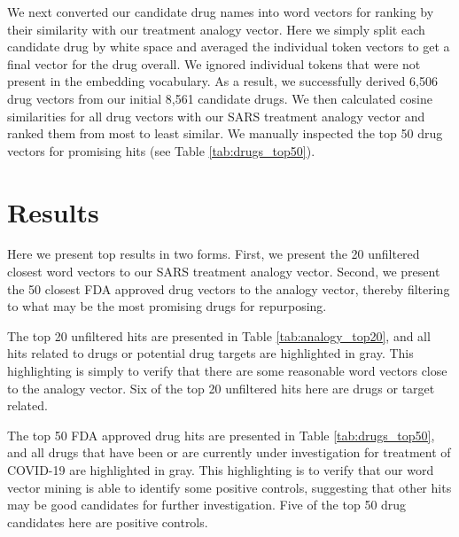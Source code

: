 \documentclass{article}
\begin{document}
We next converted our candidate drug names into word vectors for ranking by their similarity with our treatment analogy vector.
Here we simply split each candidate drug by white space and averaged the individual token vectors to get a final vector for the drug overall.
We ignored individual tokens that were not present in the embedding vocabulary.
As a result, we successfully derived 6,506 drug vectors from our initial 8,561 candidate drugs.
We then calculated cosine similarities for all drug vectors with our SARS treatment analogy vector and ranked them from most to least similar.
We manually inspected the top 50 drug vectors for promising hits (see Table \ref{tab:drugs_top50}).

\section{Results}

Here we present top results in two forms.
First, we present the 20 unfiltered closest word vectors to our SARS treatment analogy vector.
Second, we present the 50 closest FDA approved drug vectors to the analogy vector, thereby filtering to what may be the most promising drugs for repurposing.

The top 20 unfiltered hits are presented in Table \ref{tab:analogy_top20}, and all hits related to drugs or potential drug targets are highlighted in gray.
This highlighting is simply to verify that there are some reasonable word vectors close to the analogy vector.
Six of the top 20 unfiltered hits here are drugs or target related.

The top 50 FDA approved drug hits are presented in Table \ref{tab:drugs_top50}, and all drugs that have been or are currently under investigation for treatment of COVID-19 are highlighted in gray.
This highlighting is to verify that our word vector mining is able to identify some positive controls, suggesting that other hits may be good candidates for further investigation.
Five of the top 50 drug candidates here are positive controls.
\end{document}
